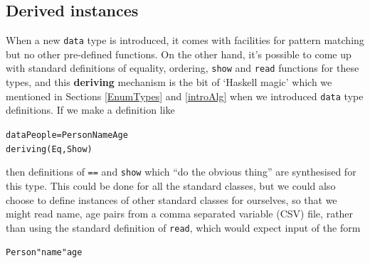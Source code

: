\subsection*{Derived instances}

When a new \texttt{data} type is introduced, it comes with facilities for pattern matching but no other pre-defined functions. On the other hand, it's possible to come up with standard definitions of equality, ordering, \texttt{show} and \texttt{read} functions for these types, and this \textbf{deriving} mechanism is the bit of `Haskell magic' which we mentioned in Sections \ref{EnumTypes} and \ref{introAlg} when we introduced \texttt{data} type definitions. If we make a definition like
\begin{alltt}
data People = Person Name Age
              deriving (Eq,Show)
\end{alltt}
then definitions of \texttt{==} and \texttt{show} which ``do the obvious thing'' are synthesised for this type. This could be done for all the standard classes, but we could  also choose to define instances of other standard classes for ourselves, so that we might read name, age pairs from a comma separated variable (CSV) file, rather than using the standard definition of \texttt{read}, which would expect input of the form
\begin{alltt}
Person "name" age
\end{alltt}



